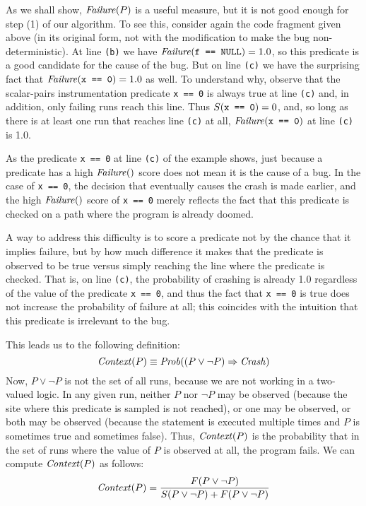 As we shall show, $\mbox{\textit{Failure}}(P)$ is a useful measure, but it is not good
enough for step (1) of our algorithm. To see this, consider again the
code fragment given above (in its original form, not with the
modification to make the bug non-deterministic).  At line {\tt (b)} we
have $\mbox{\textit{Failure}}(\mbox{\tt f == NULL}) = 1.0$, so this predicate is a good
candidate for the cause of the bug.
But on line {\tt (c)} we have the surprising fact that $\mbox{\textit{Failure}}(\mbox{\tt x == 0}) = 1.0$ as well.
To understand why, observe that the scalar-pairs instrumentation
predicate \texttt{x == 0} is always true at line {\tt (c)} and, in
addition,
only failing runs reach this line.
Thus $S(\mbox{\tt x == 0}) = 0$, and, so long as there is at least one run that
reaches line {\tt (c)} at all, $\mbox{\textit{Failure}}(\mbox{\tt x == 0})$ at line {\tt (c)} is 1.0.

As the predicate {\tt x == 0} at line {\tt (c)} of the example
shows, just because a predicate has a high $\mbox{\textit{Failure}}()$ score does not
mean it is the cause of a bug.  In the case of {\tt x == 0}, the
decision that eventually causes the crash is made earlier, and the
high $\mbox{\textit{Failure}}()$ score of {\tt x == 0} merely reflects the fact that this
predicate is checked on a path where the program is already doomed.

A way to address this difficulty is to score a predicate not by the chance
that it implies failure, but by how much difference it makes that the predicate
is observed to be true versus simply reaching the line where the predicate is checked.
That is, on line {\tt (c)}, the probability of crashing is already 1.0 regardless
of the value of the predicate {\tt x == 0}, and thus the fact that {\tt x == 0} is
true does not increase the probability of failure at all; this coincides with
the intuition that this predicate is irrelevant to the bug.

This leads us to the following definition:
\[
\mbox{\textit{Context}}(P) \equiv \mbox{\textit{Prob}}((P \lor \lnot P) \Rightarrow \mbox{\textit{Crash}})  
\]
Now, $P \lor \lnot P$ is not the set of all runs, because we are not working in a two-valued logic.
In any given run, neither $P$ nor $\lnot P$ may be observed (because the site where this predicate is
sampled is not reached), or one may be observed, or both may be observed (because the statement is executed
multiple times and $P$ is sometimes true and sometimes false).  Thus, $\mbox{\textit{Context}}(P)$ is the probability that
in the set of runs where the value of $P$ is observed at all, the program fails. We can compute $\mbox{\textit{Context}}(P)$ as follows:
\[ \mbox{\textit{Context}}(P) = \frac{F(P \lor \lnot P)}{S(P \lor \lnot P) + F(P \lor \lnot P)} \]


